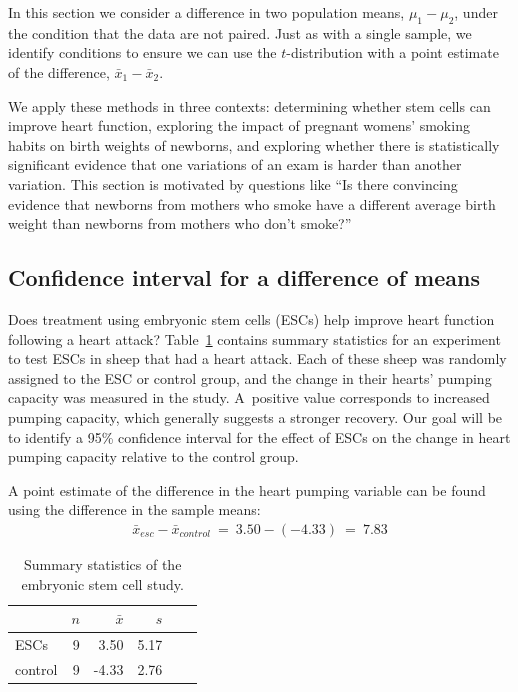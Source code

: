 {
In this section we consider a difference in two population means, $\mu_1 - \mu_2$, under the condition that the data are not paired. Just as with a single sample, we identify conditions to ensure we can use the $t$-distribution with a point estimate of the difference, $\bar{x}_1 - \bar{x}_2$.

We apply these methods in three contexts: determining whether stem cells can improve heart function, exploring the impact of pregnant womens' smoking habits on birth weights of newborns, and exploring whether there is statistically significant evidence that one variations of an exam is harder than another variation. This section is motivated by questions like ``Is there convincing evidence that newborns from mothers who smoke have a different average birth weight than newborns from mothers who don't smoke?''

\subsection{Confidence interval for a difference of means}


Does treatment using embryonic stem cells (ESCs) help improve heart function following a heart attack? Table~\ref{summaryStatsForSheepHeartDataWhoReceivedMiceESCs} contains summary statistics for an experiment to test ESCs in sheep that had a heart attack. Each of these sheep was randomly assigned to the ESC or control group, and the change in their hearts' pumping capacity was measured in the study. A~positive value corresponds to increased pumping capacity, which generally suggests a stronger recovery. Our goal will be to identify a 95\% confidence interval for the effect of ESCs on the change in heart pumping capacity relative to the control group.

A point estimate of the difference in the heart pumping variable can be found using the difference in the sample means:
\begin{eqnarray*}
\bar{x}_{esc} - \bar{x}_{control}\ =\ 3.50 - (-4.33)\ =\ 7.83
\end{eqnarray*}

\begin{table}[h]
\centering
\begin{tabular}{l rrrrr}
\hline
\hspace{10mm}	& $n$	& $\bar{x}$	& $s$  	 \\
\hline
ESCs		& 9		& 3.50		& 5.17  	\\
control		& 9		& -4.33		& 2.76  	 \\
\hline
\end{tabular}
\caption{Summary statistics of the embryonic stem cell study.}
\label{summaryStatsForSheepHeartDataWhoReceivedMiceESCs}
\end{table}

}
